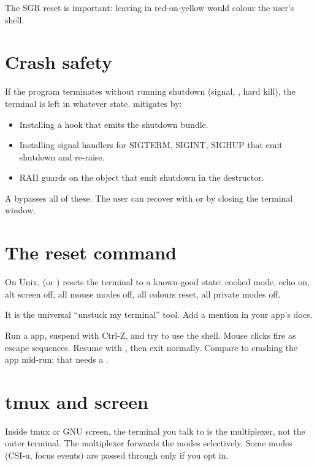 The SGR reset is important: leaving in red-on-yellow would
colour the user's shell.

\section{Crash safety}

If the program terminates without running shutdown (signal,
, hard kill), the terminal is left in
whatever state. \maya{} mitigates by:

\begin{itemize}[leftmargin=*]
  \item Installing a  hook that emits the
    shutdown bundle.
  \item Installing signal handlers for SIGTERM, SIGINT,
    SIGHUP that emit shutdown and re-raise.
  \item RAII guards on the  object that emit
    shutdown in the destructor.
\end{itemize}

A  bypasses all of these. The user can recover
with  or by closing the terminal window.

\section{The reset command}

On Unix,  (or ) resets the
terminal to a known-good state: cooked mode, echo on, alt
screen off, all mouse modes off, all colours reset, all
private modes off.

It is the universal ``unstuck my terminal'' tool. Add a
mention in your app's docs.

\begin{tryit}
Run a \maya{} app, suspend with Ctrl-Z, and try to use the
shell. Mouse clicks fire as escape sequences. Resume with
, then exit normally. Compare to crashing the app
mid-run; that needs a .
\end{tryit}

\section{tmux and screen}

Inside tmux or GNU screen, the terminal you talk to is the
multiplexer, not the outer terminal. The multiplexer
forwards the modes selectively. Some modes (CSI-u, focus
events) are passed through only if you opt in.

